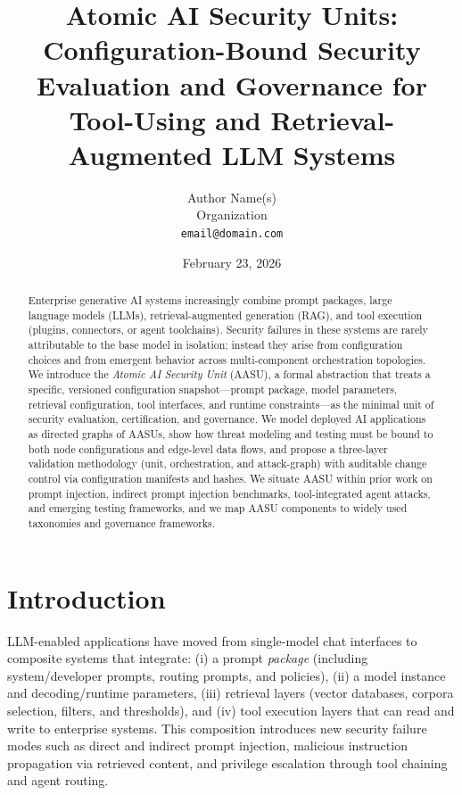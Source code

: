 \documentclass[11pt]{article}
\title{Atomic AI Security Units: Configuration-Bound Security Evaluation and Governance for Tool-Using and Retrieval-Augmented LLM Systems}
\author{
  Author Name(s) \\
  Organization \\
  \texttt{email@domain.com}
}
\date{February 23, 2026}
\newcommand{\AASU}{\textsc{AASU}}
\newcommand{\AASUs}{\AASU{}s}
\begin{document}
\maketitle

\begin{abstract}
Enterprise generative AI systems increasingly combine prompt packages, large language models (LLMs),
retrieval-augmented generation (RAG), and tool execution (plugins, connectors, or agent toolchains).
Security failures in these systems are rarely attributable to the base model in isolation; instead they arise from
configuration choices and from emergent behavior across multi-component orchestration topologies.
We introduce the \emph{Atomic AI Security Unit} (\AASU{}), a formal abstraction that treats a specific, versioned configuration
snapshot---prompt package, model parameters, retrieval configuration, tool interfaces, and runtime constraints---as the minimal unit
of security evaluation, certification, and governance.
We model deployed AI applications as directed graphs of \AASUs{}, show how threat modeling and testing must be bound to both node
configurations and edge-level data flows, and propose a three-layer validation methodology (unit, orchestration, and attack-graph)
with auditable change control via configuration manifests and hashes.
We situate \AASU{} within prior work on prompt injection, indirect prompt injection benchmarks, tool-integrated agent attacks,
and emerging testing frameworks, and we map \AASU{} components to widely used taxonomies and governance frameworks.
\end{abstract}

\section{Introduction}
LLM-enabled applications have moved from single-model chat interfaces to composite systems that integrate:
(i) a prompt \emph{package} (including system/developer prompts, routing prompts, and policies),
(ii) a model instance and decoding/runtime parameters,
(iii) retrieval layers (vector databases, corpora selection, filters, and thresholds),
and (iv) tool execution layers that can read and write to enterprise systems.
This composition introduces new security failure modes such as direct and indirect prompt injection,
malicious instruction propagation via retrieved content, and privilege escalation through tool chaining
and agent routing.
\end{document}
